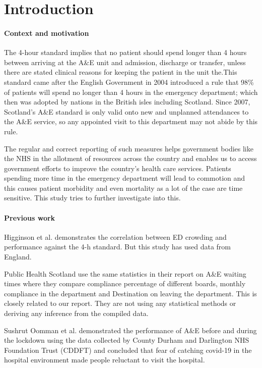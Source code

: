 \documentclass[11pt,a4paper]{article}
\begin{document}
\section{Introduction}

\paragraph{Context and motivation}
The 4-hour standard implies that no patient should spend longer than 4 hours between arriving at the A\&E unit and admission, discharge or transfer, unless there are stated clinical reasons for keeping the patient in the unit the\cite{ISD_scotland_home}.This standard came after the English Government in 2004 introduced a rule that 98\% of patients will spend no longer than 4 hours in the emergency department; which then was adopted by nations in the British isles including Scotland\cite{NHE}. Since 2007, Scotland's A\&E standard is only valid onto new and unplanned attendances to the A\&E service, so any appointed visit to this department may not abide by this rule.

The regular and correct reporting of such measures helps government bodies like the NHS in the allotment of resources across the country and enables us to access government efforts to improve the country's health care services. Patients spending more time in the emergency department will lead to commotion and this causes patient morbidity and even mortality as a lot of the case are time sensitive. This study tries to further investigate into this. 


\paragraph{Previous work}

Higginson et al. \cite{higginson} demonstrates the correlation between ED crowding and performance against the 4-h standard. But this study has used data from England.  

Public Health Scotland \cite{waiting_time_publication} use the same statistics in their report on A\&E waiting times where they compare compliance percentage of different boards, monthly compliance in the department and Destination on leaving the department. This is closely related to our report. They are not using any statistical methods or deriving any inference from the compiled data.

Sushrut Oomman et al. \cite{Oomman48} demonstrated the performance of A\&E before and during the lockdown using the data collected by County Durham and Darlington NHS Foundation Trust (CDDFT)\cite{CDDFT} and concluded that fear of catching covid-19 in the hospital environment made people reluctant to visit the hospital. 
\end{document}
